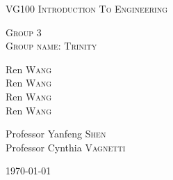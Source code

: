 
\begin{center}
\vspace*{0.7in}
\vspace*{0.7in}






\begin{center} 

{
\linespread{2}
\huge
\textsc{VG100 Introduction To Engineering} \\
}

\vspace*{0.7in}

\textsc{Group 3}\\
\textsc{Group name: Trinity}\\

\vspace*{0.7in}

Ren \textsc{Wang}\\
Ren \textsc{Wang}\\
Ren \textsc{Wang}\\
Ren \textsc{Wang}\\

\vspace*{0.7in}

Professor Yanfeng \textsc{Shen} \\
Professor Cynthia \textsc{Vagnetti} 



{\large \today}


\end{center}



\end{center}
\newpage
